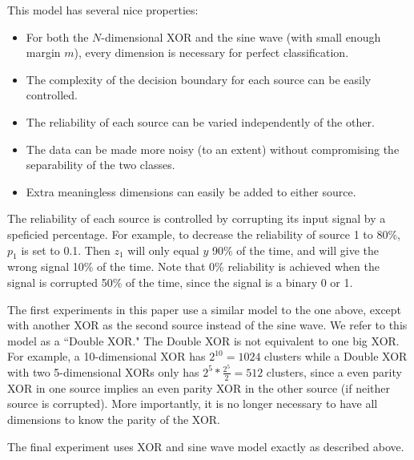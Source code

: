 \documentclass{article}
\begin{document}
\begin{minipage}{\textwidth}
\begin{minipage}{.48\textwidth}
    \label{fig:sine_wave}
\end{minipage}
\end{minipage}

This model has several nice properties:
\begin{itemize}
    \item For both the $N$-dimensional XOR and the sine wave (with small enough
        margin $m$), every dimension is necessary for perfect classification.
    \item The complexity of the decision boundary for each source can be easily
        controlled.
    \item The reliability of each source can be varied independently of the
        other.
    \item The data can be made more noisy (to an extent) without
        compromising the separability of the two classes.
    \item Extra meaningless dimensions can easily be added to either source.
\end{itemize}

The reliability of each source is controlled by corrupting its input signal by
a speficied percentage. For example, to decrease the reliability of source 1 to
80\%, $p_1$ is set to 0.1. Then $z_1$ will only equal $y$ 90\% of the time, and
will give the wrong signal 10\% of the time. Note that 0\% reliability is
achieved when the signal is corrupted 50\% of the time, since the signal is a
binary 0 or 1.

The first experiments in this paper use a similar model to the one above,
except with another XOR as the second source instead of the sine wave. We refer
to this model as a ``Double XOR." The Double XOR is not equivalent to one big
XOR. For example, a 10-dimensional XOR has $2^{10}=1024$ clusters while a Double
XOR with two 5-dimensional XORs only has $2^5 * \frac{2^5}{2} = 512$ clusters,
since a even parity XOR in one source implies an even parity XOR in the other
source (if neither source is corrupted). More importantly, it is no longer
necessary to have all dimensions to know the parity of the XOR.

The final experiment uses XOR and sine wave model exactly as described above.
\end{document}
